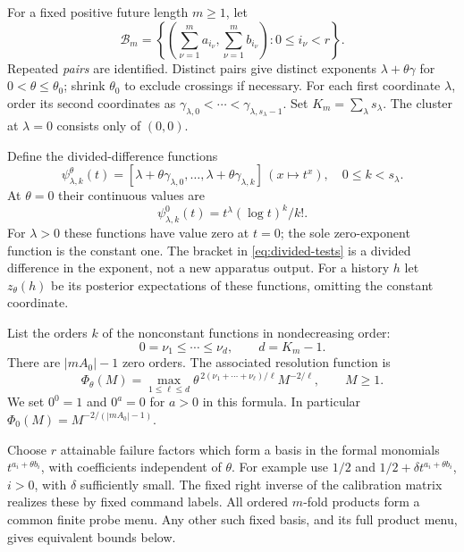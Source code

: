 \documentclass[11pt]{amsart}
\theoremstyle{definition}\newtheorem{definition}[theorem]{Definition}
\theoremstyle{remark}\newtheorem{remark}[theorem]{Remark}
\begin{document}
For a fixed positive future length $m\ge1$, let
\[
 \mathcal B_m=\left\{\left(\sum_{\nu=1}^m a_{i_\nu},
                              \sum_{\nu=1}^m b_{i_\nu}\right):
                              0\le i_\nu<r\right\}.
\]
Repeated \emph{pairs} are identified. Distinct pairs give distinct
exponents $\lambda+\theta\gamma$ for $0<\theta\le\theta_0$; shrink
$\theta_0$ to exclude crossings if necessary. For each first coordinate
$\lambda$, order its second coordinates as
$\gamma_{\lambda,0}<\cdots<\gamma_{\lambda,s_\lambda-1}$.
Set $K_m=\sum_\lambda s_\lambda$. The cluster at $\lambda=0$ consists
only of $(0,0)$.

Define the divided-difference functions
\begin{equation}\label{eq:divided-tests}
 \psi_{\lambda,k}^\theta(t)
  =[\lambda+\theta\gamma_{\lambda,0},\ldots,
       \lambda+\theta\gamma_{\lambda,k}]\,(x\mapsto t^x),
 \quad 0\le k<s_\lambda.
\end{equation}
At $\theta=0$ their continuous values are
\begin{equation}\label{eq:jet-tests}
 \psi_{\lambda,k}^0(t)=t^\lambda(\log t)^k/k!.
\end{equation}
For $\lambda>0$ these functions have value zero at $t=0$; the sole
zero-exponent function is the constant one. The bracket in
\eqref{eq:divided-tests} is a divided difference in the exponent, not a
new apparatus output. For a history $h$ let $z_\theta(h)$ be its posterior
expectations of these functions, omitting the constant coordinate.

List the orders $k$ of the nonconstant functions in nondecreasing order:
\[
 0=\nu_1\le\cdots\le\nu_d,\qquad d=K_m-1.
\]
There are $|mA_0|-1$ zero orders. The associated resolution function is
\begin{equation}\label{eq:resolution-function}
 \Phi_\theta(M)=\max_{1\le\ell\le d}
       \theta^{\,2(\nu_1+\cdots+\nu_\ell)/\ell}M^{-2/\ell},
       \qquad M\ge1.
\end{equation}
We set $0^0=1$ and $0^a=0$ for $a>0$ in this formula. In particular
$\Phi_0(M)=M^{-2/(|mA_0|-1)}$.

Choose $r$ attainable failure factors which form a basis in the formal
monomials $t^{a_i+\theta b_i}$, with coefficients independent of $\theta$.
For example use $1/2$ and $1/2+\delta t^{a_i+\theta b_i}$, $i>0$,
with $\delta$ sufficiently small. The fixed right inverse of the
calibration matrix realizes these by fixed command labels. All ordered
$m$-fold products form a common finite probe menu. Any other such fixed
basis, and its full product menu, gives equivalent bounds below.
\end{document}
